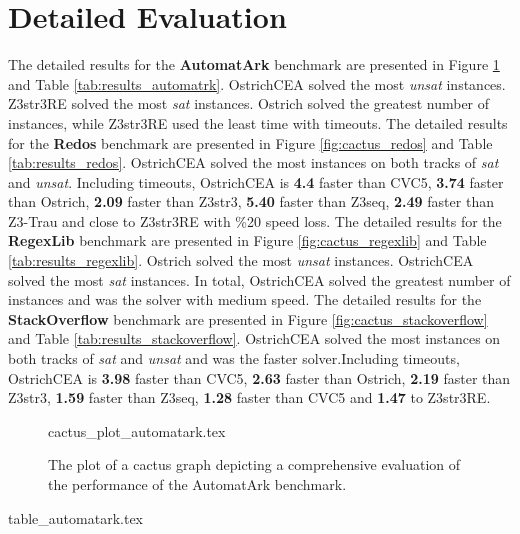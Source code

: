 \section{Detailed Evaluation} \label{appendix:experiential_results}
The detailed results for the \textbf{AutomatArk} benchmark are presented in Figure \ref{fig:cactus_automatrk} and Table \ref{tab:results_automatrk}. OstrichCEA solved the most \emph{unsat} instances. Z3str3RE solved the most \emph{sat} instances. Ostrich solved the greatest number of instances, while Z3str3RE used the least time with timeouts.\newline
The detailed results for the \textbf{Redos} benchmark are presented in Figure \ref{fig:cactus_redos} and Table \ref{tab:results_redos}. OstrichCEA solved the most instances on both tracks of \emph{sat} and \emph{unsat}. Including timeouts, OstrichCEA is \textbf{4.4}\mult{} faster than CVC5, \textbf{3.74}\mult{} faster than Ostrich, \textbf{2.09}\mult{} faster than Z3str3, \textbf{5.40}\mult{} faster than Z3seq, \textbf{2.49}\mult{} faster than Z3-Trau and close to Z3str3RE with \%20 speed loss. \newline 
The detailed results for the \textbf{RegexLib} benchmark are presented in Figure \ref{fig:cactus_regexlib} and Table \ref{tab:results_regexlib}. Ostrich solved the most \emph{unsat} instances. OstrichCEA solved the most \emph{sat} instances. In total, OstrichCEA solved the greatest number of instances and was the solver with medium speed. \newline
The detailed results for the \textbf{StackOverflow} benchmark are presented in Figure \ref{fig:cactus_stackoverflow} and Table \ref{tab:results_stackoverflow}. OstrichCEA solved the most instances on both tracks of \emph{sat} and \emph{unsat} and was the faster solver.\newline Including timeouts, OstrichCEA is \textbf{3.98}\mult{} faster than CVC5, \textbf{2.63}\mult{} faster than Ostrich, \textbf{2.19}\mult{} faster than Z3str3, \textbf{1.59}\mult{} faster than Z3seq, \textbf{1.28}\mult{} faster than CVC5 and \textbf{1.47}\mult{} to Z3str3RE. \newline
\begin{figure}
  \centering
  {cactus_plot_automatark.tex}
  \caption{The plot of a cactus graph depicting a comprehensive evaluation of the performance of the AutomatArk benchmark.}
  \label{fig:cactus_automatrk}
\end{figure}
\begin{table}
  {table_automatark.tex}
  \caption{Detailed results for the AutomatArk benchmark.}
  \label{tab:results_automatrk}
\end{table}

